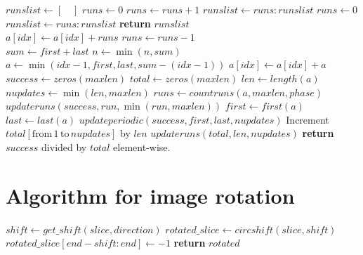 \documentclass[reprint,amsmath,amssymb,aps,pre,showkeys,showpacs,nofootinbib]{revtex4-1}
\begin{document}
\begin{algorithmic}[1]
    \State $runslist \gets [\quad]$
    \State $runs \gets 0$
        \State $runs \gets runs + 1$
        \State $runslist \gets runs:runslist$
        \State $runs \gets 0$
      \EndIf
    \EndFor
      \State $runslist \gets runs:runslist$
    \EndIf
    \State \textbf{return} $runslist$
  \EndProcedure
  \\
      \State $a[idx] \gets a[idx] + runs$
      \State $runs \gets runs - 1$
    \EndFor
  \EndProcedure
  \\
    \State $sum \gets first + last$
    \State $n \gets \min(n, sum)$
      \State $a \gets \min(idx - 1, first, last, sum - (idx - 1))$
      \State $a[idx] \gets a[idx] + a$
    \EndFor
  \EndProcedure
  \\
    \State $success \gets zeros(maxlen)$
    \State $total \gets zeros(maxlen)$
    \State $len \gets length(a)$
    \State $nupdates \gets \min(len, maxlen)$
    \State $runs \gets countruns(a, maxlen, phase)$
      \State $updateruns(success, run, \min(run, maxlen))$
    \EndFor
      \State $first \gets first(a)$
      \State $last \gets last(a)$
        \State $updateperiodic(success, first, last, nupdates)$
      \EndIf
      \State Increment $total[\text{from} \, 1 \, \text{to} \, nupdates]$ by
      $len$
    \Else
      \State $updateruns(total, len, nupdates)$
    \EndIf
    \State \textbf{return} $success$ divided by $total$ element-wise.  
  \EndProcedure
\end{algorithmic}

\section{Algorithm for image rotation}
\label{rotating}

\begin{algorithmic}[1]
      \State $shift \gets get\_shift(slice, direction)$
      \State $rotated\_slice \gets circshift(slice, shift)$
        \State $rotated\_slice[end - shift:end] \gets -1$
      \EndIf
    \EndFor
  \State \textbf{return} $rotated$
  \EndProcedure
\end{algorithmic}


\end{document}

